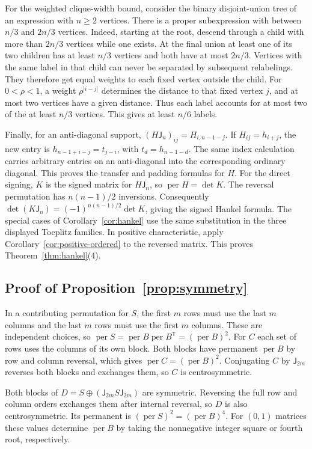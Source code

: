 \documentclass[11pt,reqno]{amsart}
\theoremstyle{remark}
\numberwithin{equation}{section}
\newcommand{\per}{\operatorname{per}}
\begin{document}
For the weighted clique-width bound, consider the binary disjoint-union
tree of an expression with \(n\ge2\) vertices. There is a proper
subexpression with between \(n/3\) and \(2n/3\) vertices. Indeed,
starting at the root, descend through a child with more than \(2n/3\)
vertices while one exists. At the final union at least one of its two
children has at least \(n/3\) vertices and both have at most \(2n/3\).
Vertices with the same label in that child can never be separated by
subsequent relabelings. They therefore get equal weights to each fixed
vertex outside the child. For \(0<\rho<1\), a weight \(\rho^{|i-j|}\)
determines the distance to that fixed vertex \(j\), and at most two
vertices have a given distance. Thus each label accounts for at most two
of the at least \(n/3\) vertices. This gives at least \(n/6\) labels.

Finally, for an anti-diagonal support, \((H\mathsf
J_n)_{ij}=H_{i,n-1-j}\). If \(H_{ij}=h_{i+j}\), the new entry is
\(h_{n-1+i-j}=t_{j-i}\), with \(t_d=h_{n-1-d}\). The same index
calculation carries arbitrary entries on an anti-diagonal into the
corresponding ordinary diagonal. This proves the transfer and padding
formulas for \(H\). For the direct signing, \(K\) is the signed matrix
for \(H\mathsf J_n\), so \(\per H=\det K\). The reversal permutation has
\(n(n-1)/2\) inversions. Consequently \(\det(K\mathsf
J_n)=(-1)^{n(n-1)/2}\det K\), giving the signed Hankel formula. The
special cases of Corollary~\ref{cor:hankel} use the same substitution in
the three displayed Toeplitz families. In positive characteristic,
apply Corollary~\ref{cor:positive-ordered} to the reversed matrix.
This proves Theorem~\ref{thm:hankel}(4).

\subsection{Proof of Proposition~\ref{prop:symmetry}}

In a contributing permutation for \(S\), the first \(m\) rows must use
the last \(m\) columns and the last \(m\) rows must use the first \(m\)
columns. These are independent choices, so \(\per S=\per B\per B^{\mathsf
T}=(\per B)^2\). For \(C\) each set of rows uses the columns of its own
block. Both blocks have permanent \(\per B\) by row and column reversal,
which gives \(\per C=(\per B)^2\). Conjugating \(C\) by \(\mathsf
J_{2m}\) reverses both blocks and exchanges them, so \(C\) is
centrosymmetric.

Both blocks of \(D=S\oplus(\mathsf J_{2m}S\mathsf J_{2m})\) are
symmetric. Reversing the full row and column orders exchanges them after
internal reversal, so \(D\) is also centrosymmetric. Its permanent is
\((\per S)^2=(\per B)^4\). For \((0,1)\) matrices these values determine
\(\per B\) by taking the nonnegative integer square or fourth root,
respectively.
\end{document}
